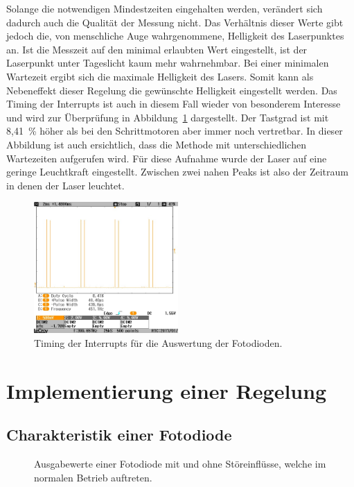 Solange die notwendigen Mindestzeiten eingehalten werden, verändert sich dadurch auch die Qualität der Messung nicht.
Das Verhältnis dieser Werte gibt jedoch die, von menschliche Auge wahrgenommene, Helligkeit des Laserpunktes an.
Ist die Messzeit auf den minimal erlaubten Wert eingestellt, ist der Laserpunkt unter Tageslicht kaum mehr wahrnehmbar.
Bei einer minimalen Wartezeit ergibt sich die maximale Helligkeit des Lasers.
Somit kann als Nebeneffekt dieser Regelung die gewünschte Helligkeit eingestellt werden.
Das Timing der Interrupts ist auch in diesem Fall wieder von besonderem Interesse und wird zur Überprüfung in Abbildung~\ref{fig:interruptFotodioden} dargestellt.
Der Tastgrad ist mit 8,41~\% höher als bei den Schrittmotoren aber immer noch vertretbar.
In dieser Abbildung ist auch ersichtlich, dass die Methode mit unterschiedlichen Wartezeiten aufgerufen wird.
Für diese Aufnahme wurde der Laser auf eine geringe Leuchtkraft eingestellt.
Zwischen zwei nahen Peaks ist also der Zeitraum in denen der Laser leuchtet.

\begin{figure} \centering
	\includegraphics[width=0.49\textwidth]{img/PicturesPlots/Timing/DiodesLaser/COPY/CONVERT/SCRN0160_Cutted.jpg}
	\caption{Timing der Interrupts für die Auswertung der Fotodioden.}
	\label{fig:interruptFotodioden}
\end{figure}


\section{Implementierung einer Regelung}

\subsection{Charakteristik einer Fotodiode}

\begin{figure} \centering
	
	\caption{Ausgabewerte einer Fotodiode mit und ohne Störeinflüsse, welche im normalen Betrieb auftreten.}
	\label{img:FotodiodesSingle}
\end{figure}

